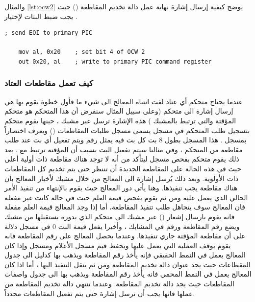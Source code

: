 \documentclass[document.tex]{subfiles}
\begin{document}
والمثال \ref{lst:ocw2} يوضح كيفية إرسال إشارة نهاية عمل دالة تخديم المقاطعة () حيث يجب ضبط البتات لإختيار .
\begin{english}

\lstset{numberstyle=\tiny,numbers=left,stepnumber=1,numbersep=5pt,tabsize=2,extendedchars=true,breaklines=true,frame=b,showspaces=false, showtabs=false,xleftmargin=10pt,framexleftmargin=10pt,framexrightmargin=5pt,framexbottommargin=4pt,showstringspaces=false,language=[x86masm]Assembler}


\begin{lstlisting}[label=lst:ocw2,caption=\en{Send EOI}]
	; send EOI to primary PIC
 
	mov	al, 0x20	; set bit 4 of OCW 2
	out	0x20, al	; write to primary PIC command register
\end{lstlisting}
\end{english}


\subsubsection{كيف تعمل مقاطعات العتاد}
عندما يحتاج متحكم أي عتاد لفت انتباه المعالج الى شيء ما فأول خطوة يقوم بها هي إرسال إشارة الى متحكم  (وعلى سبيل المثال سنفرض أن هذا المتحكم هو متحكم المؤقتة  والتي ترتبط بالمشبك ) هذه الإشارة ترسل عبر مشبك  ، حينها يقوم متحكم  بتسجيل طلب المتحكم  في مسجل يسمى مسجل طلبات المقاطعات () ويعرف اختصاراً بمسجل  . هذا المسجل بطول 8 بت كل بت فيه يمثل رقم  ويتم تفعيل أي بت عند طلب مقاطعة من المتحكم ، وفي مثالنا سيتم تفعيل البت  بسبب أن المؤقتة ترتبط مع . بعد ذلك يقوم متحكم  بفحص مسجل  ليتأكد من أنه لا توجد هناك مقاطعة ذات أولية أعلى حيث في هذه الحالة على المقاطعة الجديدة أن تننظر حتى يتم تخديم كل المقاطعات ذات الأولوية. وبعد ذلك يُرسل  إشارة الى المعالج من خلال مشبك  لأخبار المعالج بأن هناك مقاطعة يجب تنفيذها. وهنا يأتي دور المعالج حيث يقوم بالإنتهاء من تنفيذ الأمر الحالي الذي يعمل عليه ومن ثم يقوم بفحص قيمة العلم  حيث في حالة كانت غير مفعلة فان المعالج سوف يتجاهل طلب تنفيذ المقاطعة، أما إذا وجد المعالج قيمة العلم مفعلة فانه يقوم بارسال إشعار () عبر مشبك  الى متحكم  الذي بدوره يستقبلها من مشبك  ويضع رقم المقاطعة ورقم  في المشابك  ، وأخيرا يفعل قيمة البت 0 في مسجل  دلالة على أن مقاطعة المؤقتة جاري تنفيذها. وعندما يحصل المعالج على رقم المقاطعة فانه يقوم بوقف العملية التي يعمل عليها ويحفظ قيم مسجل الأعلام ومسجل  وإذا كان المعالج يعمل في النمط الحقيقي فإنه يأخذ رقم المقاطعة ويذهب بها كدليل الى جدول المقطاعات  حيث يجد عنوان دالة تخديم المقاطعة ومن ثم ينقل التنفيذ اليها ، أما اذا كان المعالج يعمل في النمط المحمي فانه يأخذ رقم المقاطعة ويذهب بها الى جدول واصفات المقاطعات حيث يجد دالة تخديم المقاطعة. وعندما تنتهي دالة تخديم المقاطعة من عملها فانها يجب أن ترسل إشارة  حتى يتم تفعيل المقاطعات مجدداً. 
\end{document}
